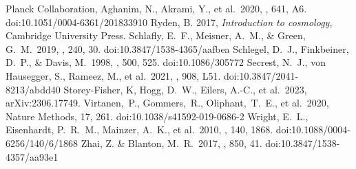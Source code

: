 \documentclass[modern]{aastex631}
\begin{document}
\begin{thebibliography}{dummy}
 Planck Collaboration, Aghanim, N., Akrami, Y., et al.\ 2020, \aap, 641, A6. doi:10.1051/0004-6361/201833910
 Ryden, B. 2017, \textit{Introduction to cosmology}, Cambridge University Press.
 Schlafly, E.~F., Meisner, A.~M., \& Green, G.~M.\ 2019, \apjs, 240, 30. doi:10.3847/1538-4365/aafbea
 Schlegel, D.~J., Finkbeiner, D.~P., \& Davis, M.\ 1998, \apj, 500, 525. doi:10.1086/305772
 Secrest, N.~J., von Hausegger, S., Rameez, M., et al.\ 2021, \apjl, 908, L51. doi:10.3847/2041-8213/abdd40
 Storey-Fisher, K, Hogg, D.~W., Eilers, A.-C., et al.\ 2023, arXiv:2306.17749.
 Virtanen,~P., Gommers,~R., Oliphant,~T.~E., et al.\ 2020, Nature Methods, 17, 261. doi:10.1038/s41592-019-0686-2
 Wright, E.~L., Eisenhardt, P.~R.~M., Mainzer, A.~K., et al.\ 2010, \aj, 140, 1868. doi:10.1088/0004-6256/140/6/1868
 Zhai, Z. \& Blanton, M.~R.\ 2017, \apj, 850, 41. doi:10.3847/1538-4357/aa93e1
\end{thebibliography}
\end{document}
